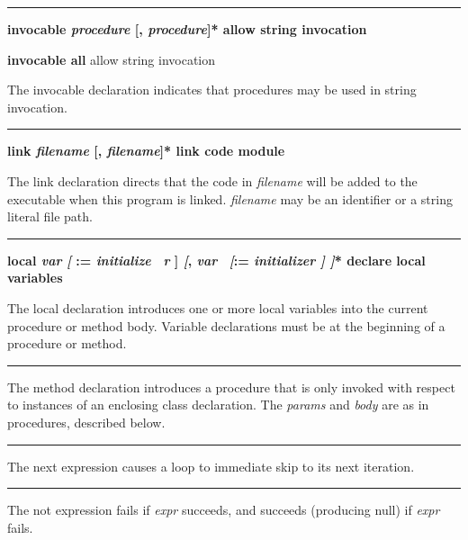 \bigskip\hrule\vspace{0.1cm}
{\bf \textbf{invocable} \textit{procedure} [, \textit{procedure}]* \hfill
allow string invocation}

\noindent
{}
{\textbf{invocable all} \hfill allow string invocation}

\noindent
The \textsf{invocable} declaration indicates that procedures may be used
in string invocation.

\bigskip\hrule\vspace{0.1cm}
{\bf \textbf{link} \textit{filename} [,
\textit{filename}]* \hfill link code module}

\noindent
The \textsf{link} declaration directs that the code in
\textit{filename} will be added to the executable when this program is
linked. \textit{filename} may be an identifier or a string literal file
path.

\bigskip\hrule\vspace{0.1cm}
{\bf \textbf{local}
\textit{var} \textit{[ }:=\textit{ initialize} \textit{\ r} ]
\textit{[}, \textit{var }\ \textit{[}:=\textit{ initializer ]
]}* \hfill declare local variables}

\noindent
{}The \textsf{local} declaration introduces one or more local
variables into the current procedure or method body.
Variable declarations must be at the beginning of a
procedure or method.

\bigskip\hrule\vspace{0.1cm}

\noindent
{}The \textsf{method} declaration introduces a procedure
that is only invoked with respect to instances of
an enclosing class declaration. The \textit{params} and \textit{body}
are as in procedures, described below.

\bigskip\hrule\vspace{0.1cm}

\noindent
{}The \textsf{next} expression causes a loop to
immediate skip to its next iteration.

\bigskip\hrule\vspace{0.1cm}

\noindent
{}The \textsf{not} expression fails if \textit{expr} succeeds,
and succeeds (producing null) if \textit{expr} fails.

